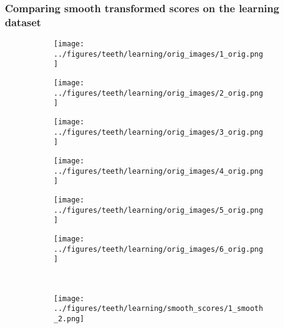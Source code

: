 \subsubsection{Comparing smooth transformed scores on the learning dataset}\label{teethlearnorig2}
\begin{figure}[h!]
	\begin{subfigure}[b]{0.03\textwidth} %
		\centering
	\end{subfigure}
	\begin{subfigure}{0.15\textwidth}
		\centering
		\texttt{[image: ../figures/teeth/learning/orig\_images/1\_orig.png]}
		\label{fig:1}
	\end{subfigure}
	\begin{subfigure}{0.15\textwidth}
		\centering
		\texttt{[image: ../figures/teeth/learning/orig\_images/2\_orig.png]}
		\label{fig:1}
	\end{subfigure}
	\begin{subfigure}{0.15\textwidth}
		\centering
		\texttt{[image: ../figures/teeth/learning/orig\_images/3\_orig.png]}
		\label{fig:1}
	\end{subfigure}
	\begin{subfigure}{0.15\textwidth}
		\centering
		\texttt{[image: ../figures/teeth/learning/orig\_images/4\_orig.png]}
		\label{fig:1}
	\end{subfigure}
	\begin{subfigure}{0.15\textwidth}
		\centering
		\texttt{[image: ../figures/teeth/learning/orig\_images/5\_orig.png]}
		\label{fig:1}
	\end{subfigure}
	\begin{subfigure}{0.15\textwidth}
		\centering
		\texttt{[image: ../figures/teeth/learning/orig\_images/6\_orig.png]}
		\label{fig:1}
	\end{subfigure}
	\vspace{-0.35cm}
	\\
	\begin{subfigure}[b]{0.03\textwidth} %
		\centering
	\end{subfigure}
	\begin{subfigure}{0.15\textwidth}
		\centering
		\texttt{[image: ../figures/teeth/learning/smooth\_scores/1\_smooth\_2.png]}

\end{subfigure}
\end{figure}
